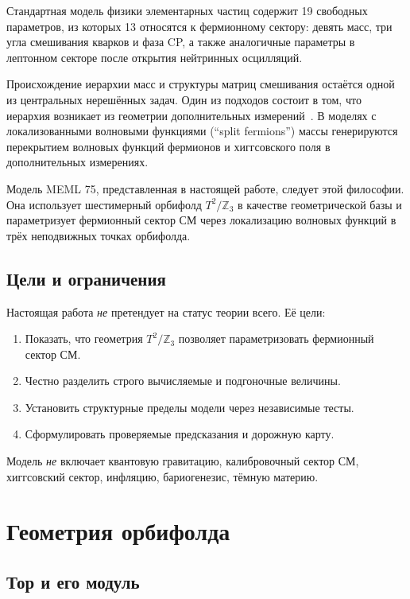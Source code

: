 \documentclass[11pt,a4paper]{article}
\numberwithin{equation}{section}
\begin{document}
Стандартная модель физики элементарных частиц
содержит 19 свободных параметров, из которых 13
относятся к фермионному сектору: девять масс,
три угла смешивания кварков и фаза CP, а также
аналогичные параметры в лептонном секторе после
открытия нейтринных осцилляций.

Происхождение иерархии масс и структуры матриц
смешивания остаётся одной из центральных
нерешённых задач. Один из подходов состоит в том,
что иерархия возникает из геометрии дополнительных
измерений~\cite{ArkaniHamed1999}. В моделях с
локализованными волновыми функциями
(``split fermions'') массы генерируются перекрытием
волновых функций фермионов и хиггсовского поля
в дополнительных измерениях.

Модель MEML 75, представленная в настоящей работе,
следует этой философии. Она использует шестимерный
орбифолд $T^2/\mathbb{Z}_3$ в качестве
геометрической базы и параметризует фермионный
сектор СМ через локализацию волновых функций
в трёх неподвижных точках орбифолда.

\subsection{Цели и ограничения}

Настоящая работа \emph{не} претендует на статус
теории всего. Её цели:
\begin{enumerate}[leftmargin=1.5em,itemsep=0.1em]
\item Показать, что геометрия $T^2/\mathbb{Z}_3$
      позволяет параметризовать фермионный сектор СМ.
\item Честно разделить строго вычисляемые и
      подгоночные величины.
\item Установить структурные пределы модели через
      независимые тесты.
\item Сформулировать проверяемые предсказания
      и дорожную карту.
\end{enumerate}

Модель \emph{не} включает квантовую гравитацию,
калибровочный сектор СМ, хиггсовский сектор,
инфляцию, бариогенезис, тёмную материю.

\section{Геометрия орбифолда}

\subsection{Тор и его модуль}
\end{document}
